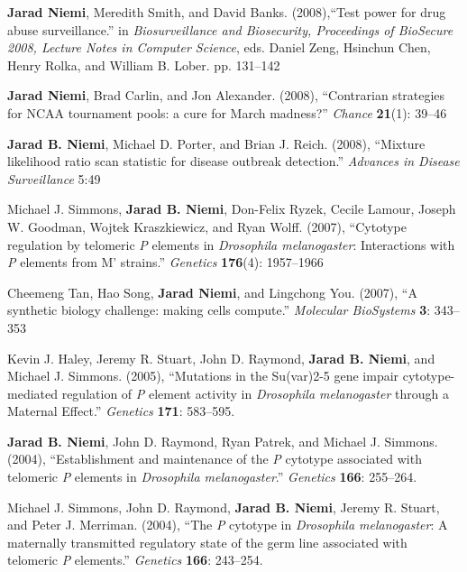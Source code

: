 \documentclass[overlapped,line,letterpaper]{res}
\begin{document}
\begin{resume}
{\bf Jarad Niemi}, Meredith Smith, and David Banks. (2008),``Test power for drug abuse surveillance.'' in \emph{Biosurveillance and Biosecurity, Proceedings of BioSecure 2008, Lecture Notes in Computer Science},  eds. Daniel Zeng, Hsinchun Chen, Henry Rolka, and William B. Lober. pp. 131--142

{\bf Jarad Niemi}, Brad Carlin, and Jon Alexander. (2008), ``Contrarian strategies for NCAA tournament pools: a cure for March madness?'' \emph{Chance} {\bf 21}(1): 39--46

{\bf Jarad B. Niemi}, Michael D. Porter, and Brian J. Reich. (2008), ``Mixture likelihood ratio scan statistic for disease outbreak detection.'' \emph{Advances in Disease Surveillance} 5:49


Michael J. Simmons, {\bf Jarad B. Niemi}, Don-Felix Ryzek, Cecile Lamour, Joseph W. Goodman, Wojtek Kraszkiewicz, and Ryan Wolff. (2007), ``Cytotype regulation by telomeric \emph{P} elements in \emph{Drosophila melanogaster}: Interactions with \emph{P} elements from M' strains.'' \emph{Genetics} {\bf 176}(4): 1957--1966

Cheemeng Tan, Hao Song, {\bf Jarad Niemi}, and Lingchong You. (2007), ``A synthetic biology challenge: making cells compute.'' \emph{Molecular BioSystems}  {\bf 3}: 343--353

Kevin J. Haley, Jeremy R. Stuart, John D. Raymond, {\bf Jarad B. Niemi}, and Michael J. Simmons. (2005), ``Mutations in the Su(var)2-5 gene impair cytotype-mediated regulation of \emph{P} element activity in \emph{Drosophila melanogaster} through a Maternal Effect.'' \emph{Genetics} {\bf 171}: 583--595.

{\bf Jarad B. Niemi}, John D. Raymond, Ryan Patrek, and Michael J. Simmons. (2004), ``Establishment and maintenance of the \emph{P} cytotype associated with telomeric \emph{P} elements in \emph{Drosophila melanogaster}.'' \emph{Genetics} {\bf 166}: 255--264.

Michael J. Simmons, John D. Raymond, {\bf Jarad B. Niemi}, Jeremy R. Stuart, and Peter J. Merriman. (2004), ``The \emph{P} cytotype in \emph{Drosophila melanogaster}: A maternally transmitted regulatory state of the germ line associated with telomeric \emph{P} elements.'' \emph{Genetics} {\bf 166}: 243--254.


\end{resume}
\end{document}
